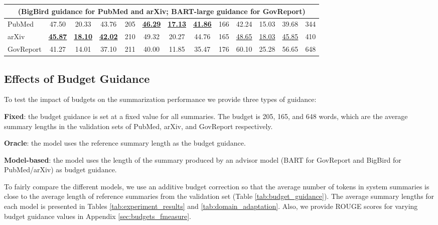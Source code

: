 \documentclass[11pt,table]{article}
\newenvironment{itemizesquish}[2]{\begin{list}{\labelitemi}{\setlength{\itemsep}{#1}\setlength{\labelwidth}{#2}\setlength{\leftmargin}{\labelwidth}\addtolength{\leftmargin}{\labelsep}}}{\end{list}}
\begin{document}
\begin{table*}
\begin{tabular}{l|cccc|cccc|cccc}
    \multicolumn{13}{c}{(BigBird guidance for PubMed and arXiv; BART-large guidance for GovReport)} \\
    \midrule
    PubMed & \cellcolor{blue!10}47.50 & \cellcolor{blue!10}20.33 & \cellcolor{blue!10}43.76 & \cellcolor{blue!10}205 & \underline{\textbf{46.29}} & \underline{\textbf{17.13}} & \underline{\textbf{41.86}} & 166 & 42.24 & 15.03 & 39.68 & 344 \\
    arXiv & \underline{\textbf{45.87}} & \underline{\textbf{18.10}} & \underline{\textbf{42.02}} & 210 & \cellcolor{blue!10}49.32 & \cellcolor{blue!10}20.27 & \cellcolor{blue!10}44.76 & \cellcolor{blue!10}165 & \underline{48.65} & \underline{18.03} & \underline{45.85} & 410 \\
    GovReport & 41.27 & 14.01 & 37.10 & 211 & 40.00 & 11.85 & 35.47 & 176 & \cellcolor{blue!10}60.10 & \cellcolor{blue!10}25.28 & \cellcolor{blue!10}56.65 & \cellcolor{blue!10}648 \\
    \bottomrule
  \end{tabular}
  \caption{ROUGE F1 scores and average words per summary for the domain adaptation experiments. Models trained on PubMed, arXiv, and GovReport samples (rows) are used to summarize articles from the other dataset test splits (columns). The choice of budget guidance values is described in Appendix \ref{sec:inference_details}. \colorbox{blue!10}{Shaded scores} are in-domain results from Table \ref{tab:experiment_results}. \underline{Underlined results} are statistically equivalent to the best cross-domain scores ($p<0.05$).}\label{tab:domain_adaptation}
\end{table*}

\subsection{Effects of Budget Guidance}
\label{sec:results-budget-guidance}
To test the impact of budgets on the summarization performance we provide three types of guidance: 
\begin{itemizesquish}{-0.3em}{0.5em}
    \item \textbf{Fixed}: the budget guidance is set at a fixed value for all summaries. The budget is 205, 165, and 648 words, which are the average summary lengths in the validation sets of PubMed, arXiv, and GovReport respectively.
    \item \textbf{Oracle}: the model uses the reference summary length as the budget guidance.
    \item \textbf{Model-based}: the model uses the length of the summary produced by an advisor model (BART for GovReport and BigBird for PubMed/arXiv) as budget guidance.
\end{itemizesquish}
To fairly compare the different models, we use an additive budget correction so that the average number of tokens in system summaries is close to the average length of reference summaries from the validation set (Table \ref{tab:budget_guidance}). The average summary lengths for each model is presented in Tables \ref{tab:experiment_results} and \ref{tab:domain_adaptation}. Also, we provide ROUGE scores for varying budget guidance values in Appendix \ref{sec:budgets_fmeasure}.
\end{document}
